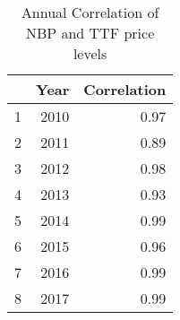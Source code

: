 \begin{table}[ht]
\centering
\begin{tabular}{rrr}
  \hline
 & Year & Correlation \\ 
  \hline
1 & 2010 & 0.97 \\ 
  2 & 2011 & 0.89 \\ 
  3 & 2012 & 0.98 \\ 
  4 & 2013 & 0.93 \\ 
  5 & 2014 & 0.99 \\ 
  6 & 2015 & 0.96 \\ 
  7 & 2016 & 0.99 \\ 
  8 & 2017 & 0.99 \\ 
   \hline
\end{tabular}
\caption{Annual Correlation of NBP and TTF price levels} 
\label{tab:nbp_ttf_level_corr_annual}
\end{table}
